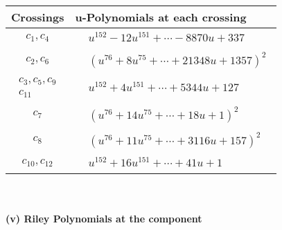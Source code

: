 \documentclass[1p]{elsarticle_modified}
\theoremstyle{definition}
\begin{document}
\begin{tabular}{m{50pt}|m{274pt}}
Crossings & \hspace{64pt}u-Polynomials at each crossing \\
\hline $$\begin{aligned}c_{1},c_{4}\end{aligned}$$&$\begin{aligned}
&u^{152}-12 u^{151}+\cdots-8870 u+337
\end{aligned}$\\
\hline $$\begin{aligned}c_{2},c_{6}\end{aligned}$$&$\begin{aligned}
&(u^{76}+8 u^{75}+\cdots+21348 u+1357)^{2}
\end{aligned}$\\
\hline $$\begin{aligned}c_{3},c_{5},c_{9}\\c_{11}\end{aligned}$$&$\begin{aligned}
&u^{152}+4 u^{151}+\cdots+5344 u+127
\end{aligned}$\\
\hline $$\begin{aligned}c_{7}\end{aligned}$$&$\begin{aligned}
&(u^{76}+14 u^{75}+\cdots+18 u+1)^{2}
\end{aligned}$\\
\hline $$\begin{aligned}c_{8}\end{aligned}$$&$\begin{aligned}
&(u^{76}+11 u^{75}+\cdots+3116 u+157)^{2}
\end{aligned}$\\
\hline $$\begin{aligned}c_{10},c_{12}\end{aligned}$$&$\begin{aligned}
&u^{152}+16 u^{151}+\cdots+41 u+1
\end{aligned}$\\
\hline
\end{tabular}\\~\\
\newpage\renewcommand{\arraystretch}{1}
\flushleft \textbf{(v) Riley Polynomials at the component}\newline \\
\end{document}
